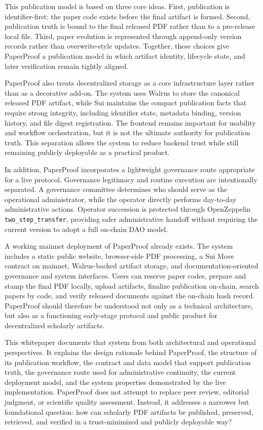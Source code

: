 \documentclass[journal]{IEEEtran}
\begin{document}
This publication model is based on three core ideas. First, publication is identifier-first: the paper code exists before the final artifact is formed. Second, publication truth is bound to the final released PDF rather than to a pre-release local file. Third, paper evolution is represented through append-only version records rather than overwrite-style updates. Together, these choices give PaperProof a publication model in which artifact identity, lifecycle state, and later verification remain tightly aligned.

PaperProof also treats decentralized storage as a core infrastructure layer rather than as a decorative add-on. The system uses Walrus to store the canonical released PDF artifact, while Sui maintains the compact publication facts that require strong integrity, including identifier state, metadata binding, version history, and file digest registration. The frontend remains important for usability and workflow orchestration, but it is not the ultimate authority for publication truth. This separation allows the system to reduce backend trust while still remaining publicly deployable as a practical product.

In addition, PaperProof incorporates a lightweight governance route appropriate for a live protocol. Governance legitimacy and routine execution are intentionally separated. A governance committee determines who should serve as the operational administrator, while the operator directly performs day-to-day administrative actions. Operator succession is protected through OpenZeppelin \texttt{two\_step\_transfer}, providing safer administrative handoff without requiring the current version to adopt a full on-chain DAO model.

A working mainnet deployment of PaperProof already exists. The system includes a static public website, browser-side PDF processing, a Sui Move contract on mainnet, Walrus-backed artifact storage, and documentation-oriented governance and system interfaces. Users can reserve paper codes, prepare and stamp the final PDF locally, upload artifacts, finalize publication on-chain, search papers by code, and verify released documents against the on-chain hash record. PaperProof should therefore be understood not only as a technical architecture, but also as a functioning early-stage protocol and public product for decentralized scholarly artifacts.

This whitepaper documents that system from both architectural and operational perspectives. It explains the design rationale behind PaperProof, the structure of its publication workflow, the contract and data model that support publication truth, the governance route used for administrative continuity, the current deployment model, and the system properties demonstrated by the live implementation. PaperProof does not attempt to replace peer review, editorial judgment, or scientific quality assessment. Instead, it addresses a narrower but foundational question: how can scholarly PDF artifacts be published, preserved, retrieved, and verified in a trust-minimized and publicly deployable way?
\end{document}
